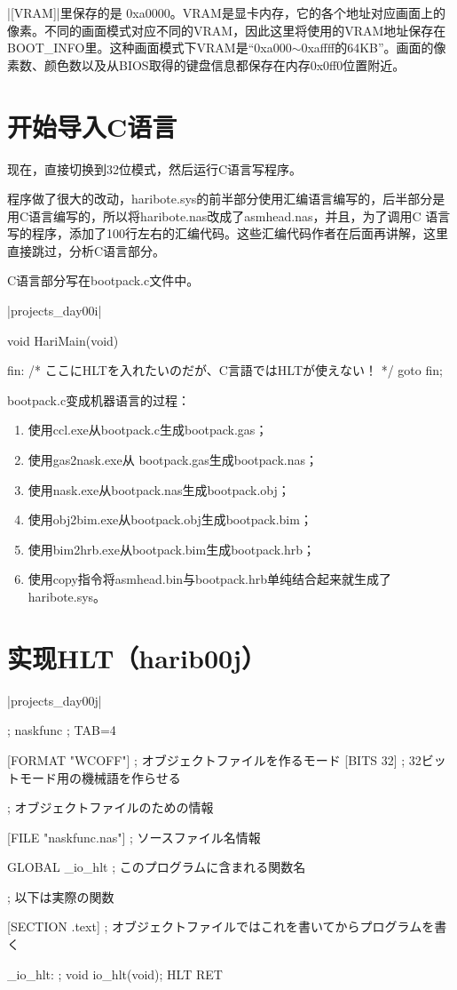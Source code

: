 |[VRAM]|里保存的是 0xa0000。VRAM是显卡内存，它的各个地址对应画面上的像素。不同的画面模式对应不同的VRAM，因此这里将使用的VRAM地址保存在BOOT\_INFO里。这种画面模式下VRAM是“0xa000$\sim$0xaffff的64KB”。画面的像素数、颜色数以及从BIOS取得的键盘信息都保存在内存0x0ff0位置附近。


\section{	开始导入C语言	}

现在，直接切换到32位模式，然后运行C语言写程序。

程序做了很大的改动，haribote.sys的前半部分使用汇编语言编写的，后半部分是用C语言编写的，所以将haribote.nas改成了asmhead.nas，并且，为了调用C 语言写的程序，添加了100行左右的汇编代码。这些汇编代码作者在后面再讲解，这里直接跳过，分析C语言部分。

C语言部分写在bootpack.c文件中。

\dag|projects_day\harib00i|
\begin{code}[label=bootpack.c]
void HariMain(void)
{

fin:
	/* ここにHLTを入れたいのだが、C言語ではHLTが使えない！ */
	goto fin;

}
\end{code}

\cs

bootpack.c变成机器语言的过程：
\begin{enumerate}
  \item 使用ccl.exe从bootpack.c生成bootpack.gas；
  \item 使用gas2nask.exe从 bootpack.gas生成bootpack.nas；
  \item 使用nask.exe从bootpack.nas生成bootpack.obj；
  \item 使用obj2bim.exe从bootpack.obj生成bootpack.bim；
  \item 使用bim2hrb.exe从bootpack.bim生成bootpack.hrb；
  \item 使用copy指令将asmhead.bin与bootpack.hrb单纯结合起来就生成了haribote.sys。
\end{enumerate}

\section{	实现HLT（harib00j）	}

\dag|projects_day\harib00j|
\begin{code}[label=naskfun.nas]
; naskfunc
; TAB=4

[FORMAT "WCOFF"]				; オブジェクトファイルを作るモード	
[BITS 32]						; 32ビットモード用の機械語を作らせる


; オブジェクトファイルのための情報

[FILE "naskfunc.nas"]			; ソースファイル名情報

		GLOBAL	_io_hlt			; このプログラムに含まれる関数名


; 以下は実際の関数

[SECTION .text]		; オブジェクトファイルではこれを書いてからプログラムを書く

_io_hlt:	; void io_hlt(void);
		HLT
		RET
\end{code}

